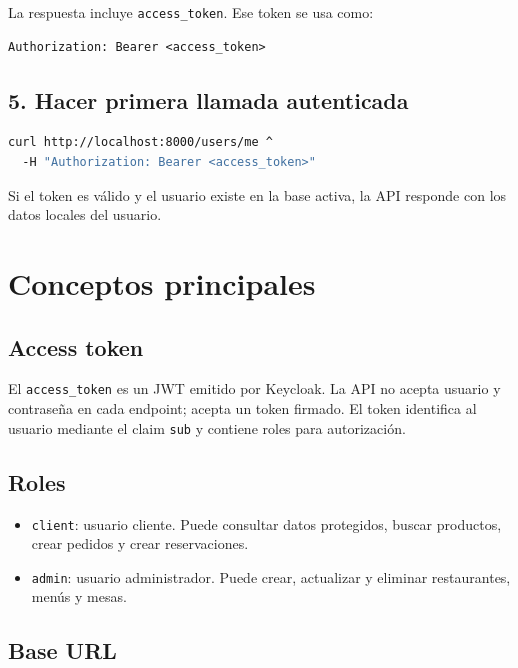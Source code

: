 \documentclass[12pt,letterpaper]{article}
\def\codefile#1{\nolinkurl{#1}}
\begin{document}
La respuesta incluye \codefile{access\_token}. Ese token se usa como:

\begin{lstlisting}
Authorization: Bearer <access_token>
\end{lstlisting}

\subsection{5. Hacer primera llamada autenticada}

\begin{lstlisting}[language=bash]
curl http://localhost:8000/users/me ^
  -H "Authorization: Bearer <access_token>"
\end{lstlisting}

Si el token es válido y el usuario existe en la base activa, la API responde con los datos locales del usuario.

\section{Conceptos principales}

\subsection{Access token}

El \codefile{access\_token} es un JWT emitido por Keycloak. La API no acepta usuario y contraseña en cada endpoint; acepta un token firmado. El token identifica al usuario mediante el claim \codefile{sub} y contiene roles para autorización.

\subsection{Roles}

\begin{itemize}
    \item \codefile{client}: usuario cliente. Puede consultar datos protegidos, buscar productos, crear pedidos y crear reservaciones.
    \item \codefile{admin}: usuario administrador. Puede crear, actualizar y eliminar restaurantes, menús y mesas.
\end{itemize}

\subsection{Base URL}
\end{document}
